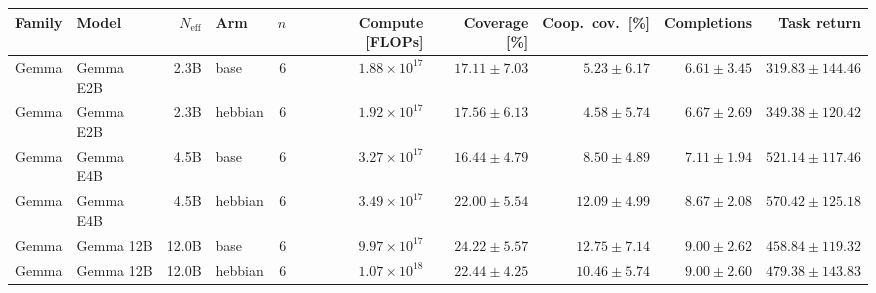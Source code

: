 \begin{tabular}{llrlrrrrrr}
\toprule
Family & Model & $N_{\mathrm{eff}}$ & Arm & $n$ & Compute [FLOPs] & Coverage [\%] & Coop.\ cov.\ [\%] & Completions & Task return \\
\midrule
Gemma & Gemma E2B & 2.3B & base & 6 & $1.88\times10^{17}$ & $17.11 \pm 7.03$ & $5.23 \pm 6.17$ & $6.61 \pm 3.45$ & $319.83 \pm 144.46$ \\
Gemma & Gemma E2B & 2.3B & hebbian & 6 & $1.92\times10^{17}$ & $17.56 \pm 6.13$ & $4.58 \pm 5.74$ & $6.67 \pm 2.69$ & $349.38 \pm 120.42$ \\
Gemma & Gemma E4B & 4.5B & base & 6 & $3.27\times10^{17}$ & $16.44 \pm 4.79$ & $8.50 \pm 4.89$ & $7.11 \pm 1.94$ & $521.14 \pm 117.46$ \\
Gemma & Gemma E4B & 4.5B & hebbian & 6 & $3.49\times10^{17}$ & $22.00 \pm 5.54$ & $12.09 \pm 4.99$ & $8.67 \pm 2.08$ & $570.42 \pm 125.18$ \\
Gemma & Gemma 12B & 12.0B & base & 6 & $9.97\times10^{17}$ & $24.22 \pm 5.57$ & $12.75 \pm 7.14$ & $9.00 \pm 2.62$ & $458.84 \pm 119.32$ \\
Gemma & Gemma 12B & 12.0B & hebbian & 6 & $1.07\times10^{18}$ & $22.44 \pm 4.25$ & $10.46 \pm 5.74$ & $9.00 \pm 2.60$ & $479.38 \pm 143.83$ \\
\bottomrule
\end{tabular}
